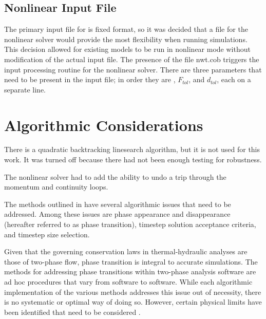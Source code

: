 \subsection{Nonlinear Input File}
\label{subsect:nlnCobraInputFile}
The primary input file for \cobra{} is fixed format, so it was decided that a  file for the nonlinear solver would provide the most flexibility when running simulations.
This decision allowed for existing models to be run in nonlinear mode without modification of the actual input file.
The presence of the file nwt.cob triggers the input processing routine for the nonlinear solver.
There are three parameters that need to be present in the input file; in order they are \kmax{}, $F_{tol}$, and $d_{tol}$, each on a separate line. 


\section{Algorithmic Considerations}
\label{sect:algoConcerns}
There is a quadratic backtracking linesearch algorithm, but it is not used for this work.
It was turned off because there had not been enough testing for robustness.

The nonlinear solver had to add the ability to undo a trip through the momentum and continuity loops.

The methods outlined in  have several algorithmic issues that need to be addressed.
Among these issues are phase appearance and disappearance (hereafter referred to as phase transition), timestep solution acceptance criteria, and timestep size selection.

Given that the governing conservation laws in thermal-hydraulic analyses are those of two-phase flow, phase transition is integral to accurate simulations.
The methods for addressing phase transitions within two-phase analysis software are ad hoc procedures that vary from software to software.
While each algorithmic implementation of the various methods addresses this issue out of necessity, there is no systematic or optimal way of doing so.
However, certain physical limits have been identified that need to be considered \cite{Bestion2000}.

